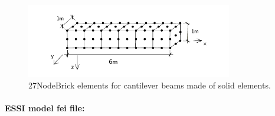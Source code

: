 \documentclass[fleqn,11pt]{article}
\begin{document}
\begin{figure}[!htb]
  \centering
  \includegraphics[width=9cm]{../Figure-files/_Chapter_Appendix_Illustrative_Examples/beam_27brick_6div.pdf}
  \caption{27NodeBrick elements for cantilever beams made of solid elements.}
  \label{fig 27NodeBrick elements for cantilever beams of different Poisson's ratios}
\end{figure}

\paragraph{ESSI model fei file: } ~
\end{document}
